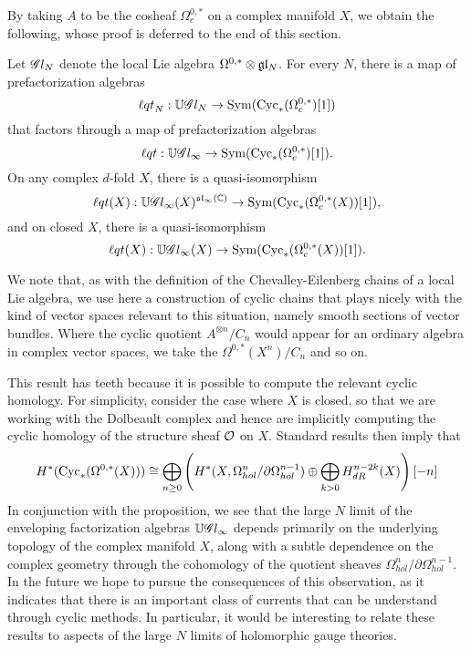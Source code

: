 By taking $A$ to be the cosheaf $\Omega^{0,*}_c$ on a complex manifold $X$,
we obtain the following, whose proof is deferred to the end of this section.

\begin{prop}
Let $\mathscr G l_N$ denote the local Lie algebra $\Omega^{0,*} \otimes \mathfrak{g} \mathfrak{l}_N$.
For every $N$, there is a map of prefactorization algebras
\[
{\ell q t}_N: \mathbb U \mathscr G l_N \to {\rm Sym}({\rm Cyc}_*(\Omega^{0,*}_c)[1])
\]
that factors through a map of prefactorization algebras
\[
{\ell q t}: \mathbb U \mathscr G l_\infty \to {\rm Sym}({\rm Cyc}_*(\Omega^{0,*}_c)[1]).
\]
On any complex $d$-fold $X$, there is a quasi-isomorphism
\[
{\ell q t}(X): \mathbb U \mathscr G l_\infty(X)^{\mathfrak{sl}_\infty(\mathbb C)} \to {\rm Sym}({\rm Cyc}_*(\Omega^{0,*}_c(X))[1]),
\]
and on closed $X$, there is a quasi-isomorphism
\[
{\ell q t}(X): \mathbb U \mathscr G l_\infty(X) \to {\rm Sym}({\rm Cyc}_*(\Omega^{0,*}_c(X))[1]).
\]
\end{prop}

\begin{rmk}
We note that, as with the definition of the Chevalley-Eilenberg chains of a local Lie algebra,
we use here a construction of cyclic chains that plays nicely with the kind of vector spaces relevant to this situation,
namely smooth sections of vector bundles.
Where the cyclic quotient $A^{\otimes n}/C_n$ would appear for an ordinary algebra in complex vector spaces,
we take the $\Omega^{0,*}(X^n)/C_n$ and so on.
\end{rmk}


This result has teeth because it is possible to compute the relevant cyclic homology.
For simplicity, consider the case where $X$ is closed, 
so that we are working with the Dolbeault complex and hence are implicitly computing the cyclic homology of the structure sheaf $\mathcal O$ on $X$.
Standard results  then imply that
\[
H^*({\rm Cyc}_*(\Omega^{0,*}(X))) \cong \bigoplus_{n \geq 0} \left( H^*(X, \Omega^n_{hol}/\partial \Omega^{n-1}_{hol}) \oplus \bigoplus_{k > 0} H^{n-2k}_{dR}(X) \right)[-n]
\]
In conjunction with the proposition, we see that the large $N$ limit of the enveloping factorization algebras $\mathbb U \mathscr G l_\infty$ depends primarily on the underlying topology of the complex manifold $X$, 
along with a subtle dependence on the complex geometry through the cohomology of the quotient sheaves $\Omega^n_{hol}/\partial \Omega^{n-1}_{hol}$.
In the future we hope to pursue the consequences of this observation, 
as it indicates that there is an important class of currents that can be understand through cyclic methods.
In particular, it would be interesting to relate these results to aspects of the large $N$ limits of holomorphic gauge theories.


